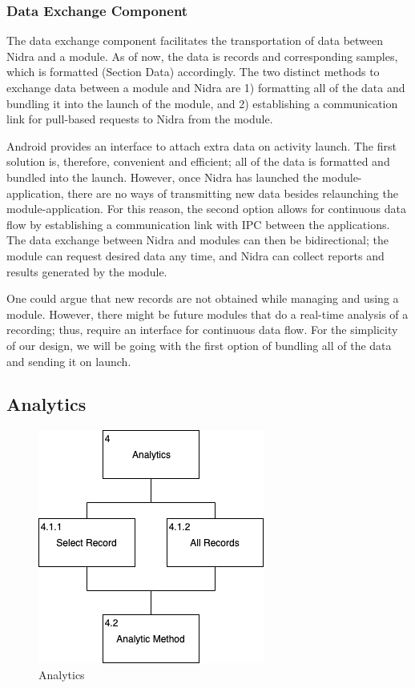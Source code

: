 \subsubsection{Data Exchange Component}

The data exchange component facilitates the transportation of data between Nidra and a module. As of now, the data is records and corresponding samples, which is formatted (Section Data) accordingly. The two distinct methods to exchange data between a module and Nidra are 1) formatting all of the data and bundling it into the launch of the module, and 2) establishing a communication link for pull-based requests to Nidra from the module. 

Android provides an interface to attach extra data on activity launch. The first solution is, therefore, convenient and efficient; all of the data is formatted and bundled into the launch. However, once Nidra has launched the module-application, there are no ways of transmitting new data besides relaunching the module-application. For this reason, the second option allows for continuous data flow by establishing a communication link with IPC between the applications. The data exchange between Nidra and modules can then be bidirectional; the module can request desired data any time, and Nidra can collect reports and results generated by the module. 

One could argue that new records are not obtained while managing and using a module. However, there might be future modules that do a real-time analysis of a recording; thus, require an interface for continuous data flow. For the simplicity of our design, we will be going with the first option of bundling all of the data and sending it on launch.

\subsection{Analytics}

\begin{figure}
    \centering
    \includegraphics[scale=0.6]{images/Analytics.png}
    \caption{Analytics}
    \label{fig:hta_analytics}
\end{figure}


